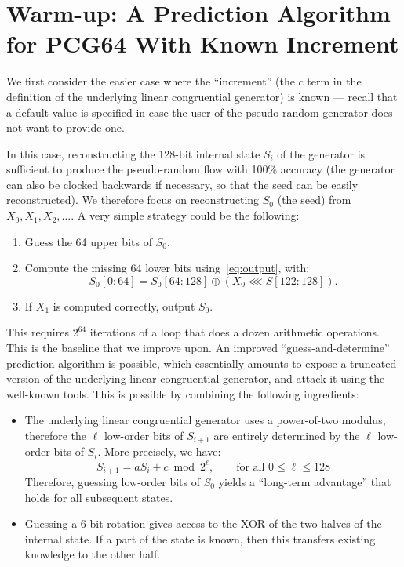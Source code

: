 \documentclass[preprint,svgnames]{iacrtrans}
\begin{document}
\section{Warm-up: A Prediction Algorithm for \textsf{PCG64} With Known Increment}

We first consider the easier case where the ``increment'' (the $c$ term in the
definition of the underlying linear congruential generator) is known --- recall
that a default value is specified in case the user of the pseudo-random
generator does not want to provide one.

In this case, reconstructing the 128-bit internal state $S_i$ of the generator
is sufficient to produce the pseudo-random flow with 100\% accuracy (the
generator can also be clocked backwards if necessary, so that the seed can be
easily reconstructed). We therefore focus on reconstructing $S_0$ (the seed)
from $X_0, X_1, X_2, \dots$. A very simple strategy could be the following:
\begin{enumerate}
\item Guess the 64 upper bits of $S_0$.
\item Compute the missing 64 lower bits using~\eqref{eq:output}, with:
\[
   S_0[0:64] = S_0[64:128] \oplus (X_0  \lll S[122:128]).
\]
\item If $X_1$ is computed correctly, output $S_0$.
\end{enumerate}

This requires $2^{64}$ iterations of a loop that does a dozen arithmetic
operations. This is the baseline that we improve upon. An improved
``guess-and-determine'' prediction algorithm is possible, which essentially
amounts to expose a truncated version of the underlying linear congruential
generator, and attack it using the well-known tools. This is possible by
combining the following ingredients:
\begin{itemize}
\item The underlying linear congruential generator uses a power-of-two modulus,
  therefore the $\ell$ low-order bits of $S_{i+1}$ are entirely determined by
  the $\ell$ low-order bits of $S_i$. More precisely, we have:
  \begin{equation}\label{eq:lcg}
    S_{i+1} = aS_i + c \bmod 2^\ell, \qquad \text{for all } 0 \leq \ell \leq 128
  \end{equation}
  Therefore, guessing low-order bits of $S_0$ yields a ``long-term advantage''
  that holds for all subsequent states.

\item Guessing a 6-bit rotation gives access to the XOR of the two halves of the
  internal state. If a part of the state is known, then this transfers existing
  knowledge to the other half.
\end{itemize}
\end{document}
